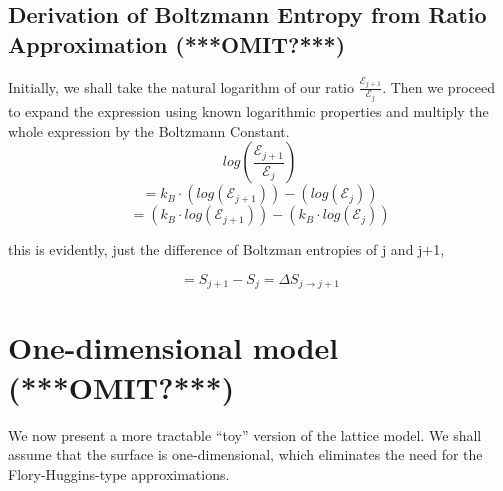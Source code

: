 \documentclass[journal=mamobx,manuscript=article]{achemso}
\begin{document}
\subsection{Derivation of Boltzmann Entropy from Ratio Approximation  (***OMIT?***)}

Initially, we shall take the natural logarithm of our ratio $\frac{\mathcal{E}_{j+1}}{\mathcal{E}_{j}}$. Then we proceed to expand the expression using known logarithmic properties and multiply the whole expression by the Boltzmann Constant.
$$log\left(\frac{\mathcal{E}_{j+1}}{\mathcal{E}_{j}}\right)$$
$$=k_B\cdot\left(log\left(\mathcal{E}_{j+1}\right)\right)-\left(log\left(\mathcal{E}_{j}\right)\right)$$
$$= \left(k_B\cdot log\left(\mathcal{E}_{j+1}\right)\right)-\left(k_B\cdot log\left(\mathcal{E}_{j}\right)\right)$$

\noindent this is evidently, just the difference of Boltzman entropies of j and j+1,

$$=S_{j+1}-S_{j}=\Delta S_{j\to j+1}$$



\section{One-dimensional model  (***OMIT?***)}


We now present a more tractable ``toy'' version of the lattice model.  We shall assume that 
the surface is one-dimensional, which eliminates the need for the Flory-Huggins-type approximations.
\end{document}
